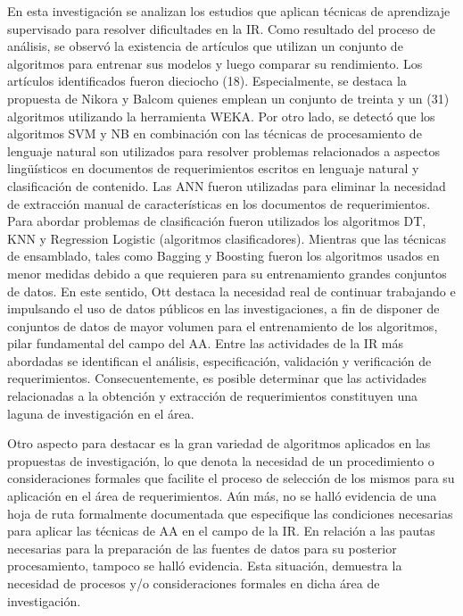 \documentclass[journal]{IEEEtran}
\begin{document}
En esta investigación se analizan los estudios que aplican técnicas de aprendizaje supervisado para resolver dificultades en la IR. Como resultado del proceso de análisis, se observó la existencia de artículos que utilizan un conjunto de algoritmos para entrenar sus modelos y luego comparar su rendimiento. Los artículos identificados fueron dieciocho (18). Especialmente, se destaca la propuesta de Nikora y Balcom \cite{nikora2009automated} quienes emplean un conjunto de treinta y un (31) algoritmos utilizando la herramienta WEKA.
Por otro lado, se detectó que los algoritmos SVM y NB en combinación con las técnicas de procesamiento de lenguaje natural son utilizados para resolver problemas relacionados a aspectos lingüísticos en documentos de requerimientos escritos en lenguaje natural y clasificación de contenido. Las ANN fueron utilizadas para eliminar la necesidad de extracción manual de características en los documentos de requerimientos. Para abordar problemas de clasificación fueron utilizados los algoritmos DT, KNN y Regression Logistic (algoritmos clasificadores). Mientras que las técnicas de ensamblado, tales como Bagging y Boosting fueron los algoritmos usados en menor medidas debido a que requieren para su entrenamiento grandes conjuntos de datos. En este sentido, Ott \cite{Ott2013} destaca la necesidad real de continuar trabajando e impulsando el uso de datos públicos en las investigaciones, a fin de disponer de conjuntos de datos de mayor volumen para el entrenamiento de los algoritmos, pilar fundamental del campo del AA. 
Entre las actividades de la IR más abordadas se identifican el análisis, especificación, validación y verificación de requerimientos. Consecuentemente, es posible determinar que las actividades relacionadas a la obtención y extracción de requerimientos constituyen una laguna de investigación en el área. 

Otro aspecto para destacar es la gran variedad de algoritmos aplicados en las propuestas de investigación, lo que denota la necesidad de un procedimiento o consideraciones formales que facilite el proceso de selección de los mismos para su aplicación en el área de requerimientos. Aún más, no se halló evidencia de una hoja de ruta formalmente documentada que especifique las condiciones necesarias para aplicar las técnicas de AA en el campo de la IR. En relación a las pautas necesarias para la preparación de las fuentes de datos para su posterior procesamiento, tampoco se halló evidencia.
Esta situación, demuestra la necesidad de procesos y/o consideraciones formales en dicha área de investigación. 
\end{document}
